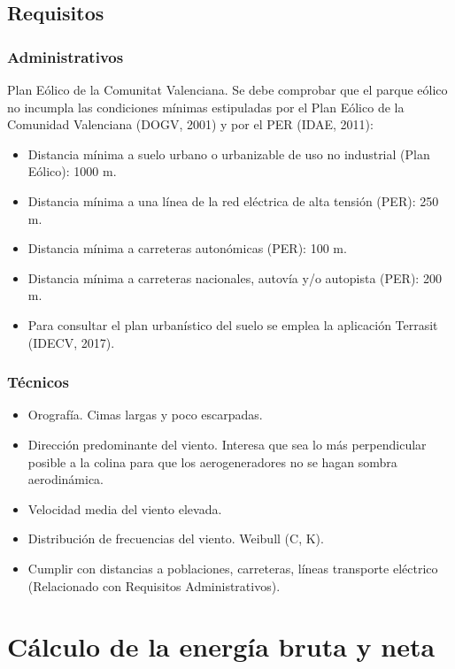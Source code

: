 \documentclass[12pt]{article}
\begin{document}
\subsection{Requisitos}

\subsubsection{Administrativos}

Plan Eólico de la Comunitat Valenciana.
Se debe comprobar que el parque eólico no incumpla las condiciones
mínimas estipuladas por el Plan Eólico de la Comunidad Valenciana (DOGV,
2001) y por el PER (IDAE, 2011):

\begin{itemize}[label = \textbullet]
    \item  Distancia mínima a suelo urbano o urbanizable de uso no industrial (Plan Eólico): 1000 m.
    \item  Distancia mínima a una línea de la red eléctrica de alta tensión (PER): 250 m.
    \item  Distancia mínima a carreteras autonómicas (PER): 100 m.
    \item  Distancia mínima a carreteras nacionales, autovía y/o autopista (PER): 200 m.
    \item  Para consultar el plan urbanístico del suelo se emplea la aplicación Terrasit (IDECV, 2017).
\end{itemize}

\subsubsection{Técnicos}
\begin{itemize}
    \item Orografía. Cimas largas y poco escarpadas.
    \item Dirección predominante del viento. Interesa que sea lo más perpendicular posible a la colina para que los aerogeneradores no se hagan sombra aerodinámica.
    \item Velocidad media del viento elevada.
    \item Distribución de frecuencias del viento. Weibull (C, K).
    \item Cumplir con distancias a poblaciones, carreteras, líneas transporte eléctrico (Relacionado con Requisitos Administrativos).
\end{itemize}



\section{Cálculo de la energía bruta y neta}
\end{document}
